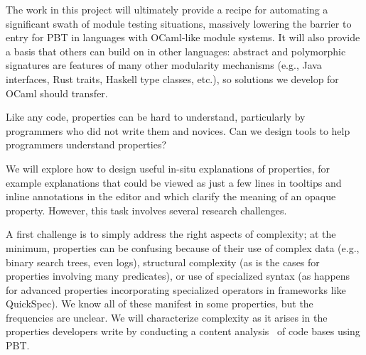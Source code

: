 The work in this project will ultimately provide a recipe for automating a
significant swath of module testing situations, massively lowering the
barrier to entry
for PBT in languages with OCaml-like module
systems. It will also
provide a basis that others can
build on in other languages: abstract and polymorphic signatures are features of
many other modularity mechanisms (e.g., Java interfaces, Rust traits, Haskell
type classes, etc.), so solutions we develop for OCaml should
transfer.


Like any code, properties can
be hard to understand, particularly by programmers who did not write
them and novices. Can we design
tools to help programmers understand properties?

We will explore how to design useful in-situ explanations of properties, for example
explanations that could be viewed as just a few lines in 
tooltips and inline annotations in the editor and which clarify the meaning 
of an opaque property. However, this task involves 
several research challenges.

A first challenge is to simply address the right 
aspects of complexity; at the minimum, properties can 
be confusing because of their use of complex data (e.g., binary search trees, 
even logs), structural complexity (as is the cases for properties involving many 
predicates), or use of specialized syntax (as happens for advanced properties 
incorporating specialized operators in frameworks like QuickSpec). We know all 
of these manifest in some properties, but the frequencies are unclear.
We will characterize complexity as it arises 
in the properties developers write by conducting a content 
analysis~\cite{ref:krippendorff2018content} of code bases using PBT.

